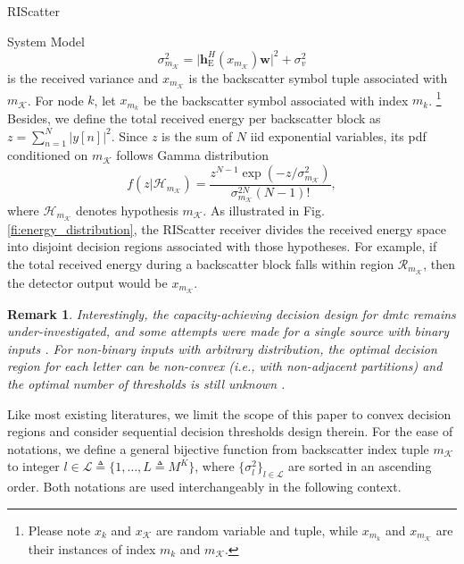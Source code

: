 \documentclass[journal]{IEEEtran}
\newtheorem{remark}{Remark}
\begin{document}
\begin{section}{RIScatter}
\begin{subsection}{System Model}
		\begin{equation}
			\sigma_{m_{\mathcal{K}}}^2 = \lvert \boldsymbol{h}_{\mathrm{E}}^H(x_{m_{\mathcal{K}}}) \boldsymbol{w} \rvert^2 + \sigma_v^2
			\label{eq:receive_variance}
		\end{equation}
		is the received variance and $x_{m_\mathcal{K}}$ is the backscatter symbol tuple associated with $m_{\mathcal{K}}$.
		For node $k$, let $x_{m_k}$ be the backscatter symbol associated with index $m_k$.%
		\footnote{
			Please note $x_k$ and $x_{\mathcal{K}}$ are random variable and tuple, while $x_{m_k}$ and $x_{m_{\mathcal{K}}}$ are their instances of index $m_k$ and $m_{\mathcal{K}}$.
		}
		Besides, we define the total received energy per backscatter block as $z=\sum_{n=1}^N \lvert y[n] \rvert^2$.
		Since $z$ is the sum of $N$ \gls{iid} exponential variables, its \gls{pdf} conditioned on $m_{\mathcal{K}}$ follows Gamma distribution
		\begin{equation}
			f(z|\mathcal{H}_{m_{\mathcal{K}}}) = \frac{z^{N-1} \exp(-z/\sigma_{m_{\mathcal{K}}}^2)}{\sigma_{m_{\mathcal{K}}}^{2N} (N-1)!},
			\label{eq:energy_distribution}
		\end{equation}
		where $\mathcal{H}_{m_{\mathcal{K}}}$ denotes hypothesis $m_{\mathcal{K}}$.
		As illustrated in Fig. \ref{fi:energy_distribution}, the RIScatter receiver divides the received energy space into disjoint decision regions associated with those hypotheses.
		For example, if the total received energy during a backscatter block falls within region $\mathcal{R}_{m_{\mathcal{K}}}$, then the detector output would be $x_{m_{\mathcal{K}}}$.
		\begin{remark}
			Interestingly, the capacity-achieving decision design for \gls{dmtc} remains under-investigated, and some attempts were made for a single source with binary inputs \cite{Qian2019b,Nguyen2021b}.
			For non-binary inputs with arbitrary distribution, the optimal decision region for each letter can be non-convex (i.e., with non-adjacent partitions) and the optimal number of thresholds is still unknown \cite{Nguyen2018,Nguyen2021}.
		\end{remark}
		Like most existing literatures, we limit the scope of this paper to convex decision regions and consider sequential decision thresholds design therein.
		For the ease of notations, we define a general bijective function from backscatter index tuple $m_{\mathcal{K}}$ to integer $l \in \mathcal{L} \triangleq \{1,\ldots,L \triangleq M^K\}$, where $\{\sigma_l^2\}_{l \in \mathcal{L}}$ are sorted in an ascending order.
		Both notations are used interchangeably in the following context.

\end{subsection}
\end{section}
\end{document}
